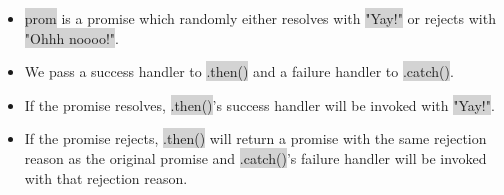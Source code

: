 \documentclass[11pt]{article}
\begin{document}
\begin{itemize}[leftmargin = *]
\item \colorbox{lightgray}{prom} is a promise which randomly either resolves with \colorbox{lightgray}{"Yay!"} or rejects with \colorbox{lightgray}{"Ohhh noooo!"}.
\item We pass a success handler to \colorbox{lightgray}{.then()} and a failure handler to \colorbox{lightgray}{.catch()}.
\item If the promise resolves, \colorbox{lightgray}{.then()}'s success handler will be invoked with \colorbox{lightgray}{"Yay!"}.
\item If the promise rejects, \colorbox{lightgray}{.then()} will return a promise with the same rejection reason as the original promise and \colorbox{lightgray}{.catch()}'s failure handler will be invoked with that rejection reason.
\end{itemize}
\end{document}

